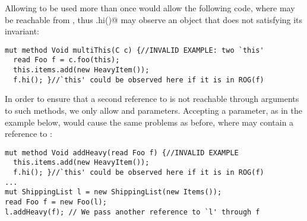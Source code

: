 Allowing \Q@this@ to be used more than once 
would allow the following code, where 
\Q@this@ may be reachable from \Q@f@, thus \Q@f.hi()@ may observe an object that does not satisfying its invariant:
\begin{lstlisting}
mut method Void multiThis(C c) {//INVALID EXAMPLE: two `this'
  read Foo f = c.foo(this);
  this.items.add(new HeavyItem());
  f.hi(); }//`this' could be observed here if it is in ROG(f)
\end{lstlisting}
\noindent In order to ensure that a second reference to \Q@this@ is not reachable through arguments to such methods, we only allow \Q@imm@ and \Q@capsule@ parameters.
Accepting a \Q@read@ parameter, as in the example below,
would cause the same problems as before, where \Q@f@ may contain
a reference to \Q@this@:
\begin{lstlisting}
mut method Void addHeavy(read Foo f) {//INVALID EXAMPLE
  this.items.add(new HeavyItem());
  f.hi(); }//`this' could be observed here if it is in ROG(f)
...
mut ShippingList l = new ShippingList(new Items());
read Foo f = new Foo(l);
l.addHeavy(f); // We pass another reference to `l' through f
\end{lstlisting}%
%
%
